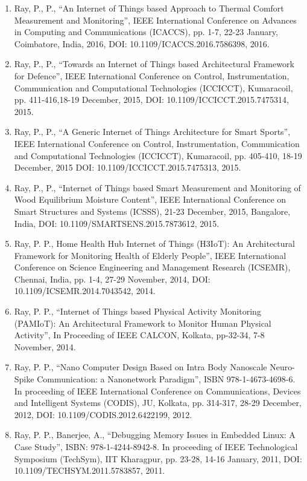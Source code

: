 \documentclass[11pt,a4paper]{moderncv}
\begin{document}
\begin{adjustwidth}{6em}{0pt}
\begin{enumerate}
	\item Ray, P., P., “An Internet of Things based Approach to Thermal Comfort Measurement and Monitoring”, IEEE International Conference on Advances in Computing and Communications (ICACCS), pp. 1-7, 22-23 January, Coimbatore, India, 2016, DOI: 10.1109/ICACCS.2016.7586398, 2016.
	
	\item Ray, P., P., “Towards an Internet of Things based Architectural Framework for Defence”, IEEE International Conference on Control, Instrumentation, Communication and Computational Technologies (ICCICCT), Kumaracoil, pp. 411-416,18-19 December, 2015, DOI: 10.1109/ICCICCT.2015.7475314, 2015.
	
	\item Ray, P., P., “A Generic Internet of Things Architecture for Smart Sports”, IEEE International Conference on Control, Instrumentation, Communication and Computational Technologies (ICCICCT), Kumaracoil, pp. 405-410, 18-19 December, 2015 DOI: 10.1109/ICCICCT.2015.7475313, 2015.
	
	\item Ray, P., P., “Internet of Things based Smart Measurement and Monitoring of Wood Equilibrium Moisture Content”, IEEE International Conference on Smart Structures and Systems (ICSSS), 21-23 December, 2015, Bangalore, India, DOI: 10.1109/SMARTSENS.2015.7873612, 2015.
	
	\item Ray, P. P., Home Health Hub Internet of Things (H3IoT): An Architectural Framework for Monitoring Health of Elderly People”, IEEE International Conference on Science Engineering and Management Research (ICSEMR), Chennai, India, pp. 1-4, 27-29 November, 2014, DOI: 10.1109/ICSEMR.2014.7043542, 2014.
	
	\item Ray, P. P., “Internet of Things based Physical Activity Monitoring (PAMIoT): An Architectural Framework to Monitor Human Physical Activity”, In Proceeding of IEEE CALCON, Kolkata, pp-32-34, 7-8 November, 2014.
	
	\item Ray, P. P., “Nano Computer Design Based on Intra Body Nanoscale Neuro-Spike Communication: a Nanonetwork Paradigm”, ISBN 978-1-4673-4698-6. In proceeding of IEEE International Conference on Communications, Devices and Intelligent Systems (CODIS), JU, Kolkata, pp. 314-317, 28-29 December, 2012, DOI: 10.1109/CODIS.2012.6422199, 2012.
	
	\item Ray, P. P., Banerjee, A., “Debugging Memory Issues in Embedded Linux: A Case Study”, ISBN: 978-1-4244-8942-8. In proceeding of IEEE Technological Symposium (TechSym), IIT Kharagpur, pp. 23-28, 14-16 January, 2011, DOI: 10.1109/TECHSYM.2011.5783857, 2011.
	

	\end{enumerate}
\end{adjustwidth}
\end{document}
